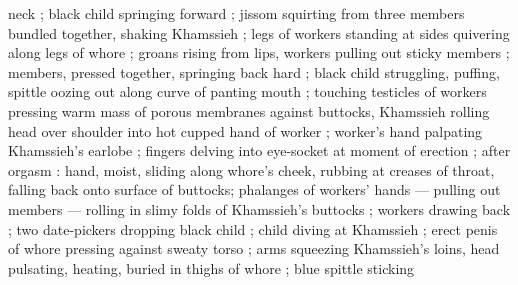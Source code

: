 \documentclass[10pt,twoside]{memoir}
\begin{document}
neck ; black child springing forward ; jissom squirting from three 
members bundled together, shaking Khamssieh ; legs of workers 
standing at sides quivering along legs of whore ; groans rising from 
lips, workers pulling out sticky members ; members, pressed 
together, springing back hard ; black child struggling, puffing, spittle 
oozing out along curve of panting mouth ; touching testicles of 
workers pressing warm mass of porous membranes against buttocks, 
Khamssieh rolling head over shoulder into hot cupped hand of 
worker ; worker's hand palpating Khamssieh's earlobe ; fingers 
delving into eye-socket at moment of erection ; after orgasm : hand, 
moist, sliding along whore's cheek, rubbing at creases of throat, 
falling back onto surface of buttocks; phalanges of workers' hands 
--- pulling out members --- rolling in slimy folds of Khamssieh's 
buttocks ; workers drawing back ; two date-pickers dropping black 
child ; child diving at Khamssieh ; erect penis of whore pressing 
against sweaty torso ; arms squeezing Khamssieh's loins, head 
pulsating, heating, buried in thighs of whore ; blue spittle sticking 
\end{document}
